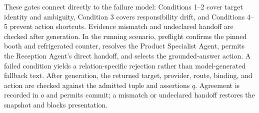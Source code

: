 These gates connect directly to the failure model: Conditions 1--2 cover target
identity and ambiguity, Condition 3 covers responsibility drift, and Conditions
4--5 prevent action shortcuts.  Evidence mismatch and undeclared handoff are
checked after generation.  In the running scenario, preflight confirms the
pinned booth and refrigerated counter, resolves the Product Specialist Agent,
permits the Reception Agent's direct handoff, and selects the grounded-answer
action.  A failed condition yields a relation-specific rejection rather than
model-generated fallback text.  After generation, the returned target,
provider, route, binding, and action are checked against the admitted tuple and
assertions \(q\).  Agreement is recorded in \(o\) and permits commit; a mismatch
or undeclared handoff restores the snapshot and blocks presentation.

